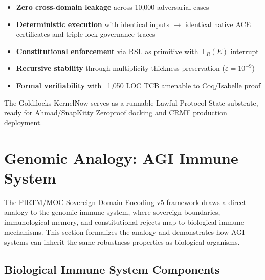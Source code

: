 \documentclass[11pt,a4paper]{article}
\begin{document}
\begin{itemize}
    \item \textbf{Zero cross-domain leakage} across 10,000 adversarial cases
    \item \textbf{Deterministic execution} with identical inputs $\to$ identical native ACE certificates and triple lock governance traces
    \item \textbf{Constitutional enforcement} via RSL as primitive with $\bot_R(E)$ interrupt
    \item \textbf{Recursive stability} through multiplicity thickness preservation ($\varepsilon = 10^{-9}$)
    \item \textbf{Formal verifiability} with ~1,050 LOC TCB amenable to Coq/Isabelle proof
\end{itemize}

The Goldilocks KernelNow serves as a runnable Lawful Protocol-State substrate, ready for Ahmad/SnapKitty Zeroproof docking and CRMF production deployment.

\section{Genomic Analogy: AGI Immune System}

The PIRTM/MOC Sovereign Domain Encoding v5 framework draws a direct analogy to the genomic immune system, where sovereign boundaries, immunological memory, and constitutional rejects map to biological immune mechanisms. This section formalizes the analogy and demonstrates how AGI systems can inherit the same robustness properties as biological organisms.

\subsection{Biological Immune System Components}
\end{document}
